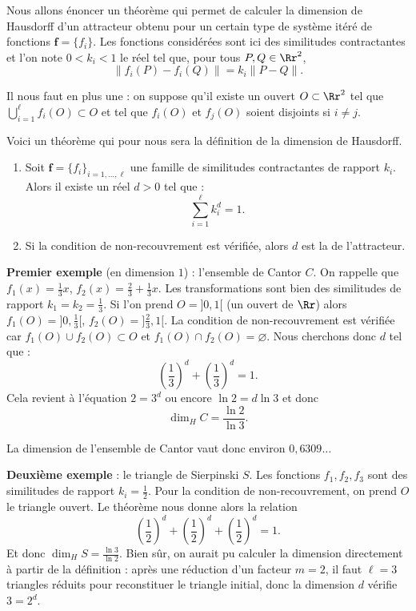 \documentclass[11pt,class=report,crop=false]{standalone}
\begin{document}
Nous allons énoncer un théorème qui permet de calculer la dimension de Hausdorff
d'un attracteur obtenu pour un certain type de système itéré de fonctions $\mathbf{f}=\{f_i\}$.
Les fonctions considérées sont ici des similitudes contractantes et l'on note $0<k_i<1$
le réel tel que, pour tous $P,Q \in \Rr^2$, 
$$\|f_i(P)-f_i(Q)\| = k_i \|P-Q\|.$$

Il nous faut en plus une  : on suppose qu'il existe un ouvert
$O \subset \Rr^2$ tel que $\bigcup_{i=1}^{\ell} f_i(O) \subset O$ et 
tel que $f_i(O)$ et $f_j(O)$ soient disjoints si $i\neq j$.

Voici un \og{}théorème\fg{} qui pour nous sera la définition de la dimension de Hausdorff.
\begin{theoreme}
\sauteligne
\begin{enumerate}
  \item Soit $\mathbf{f}=\{f_i\}_{i=1,\ldots,\ell}$ une famille de similitudes contractantes de rapport $k_i$.
Alors il existe un réel $d>0$ tel
que :
$$\sum_{i=1}^\ell k_i^d =1.$$
  \item Si la condition de non-recouvrement est vérifiée, alors 
  $d$ est la  de l'attracteur.
  \end{enumerate}
\end{theoreme}

\bigskip

\textbf{Premier exemple} (en dimension $1$) : l'ensemble de Cantor $C$. 
On rappelle que $f_1(x)=\frac 13x$, 
$f_2(x)=\frac 23 + \frac 13x$.
Les transformations sont
bien des similitudes de rapport $k_1=k_2=\frac13$.
Si l'on prend $O=]0,1[$ (un ouvert de $\Rr$) alors $f_1(O) = ]0,\frac 13[$, 
$f_2(O)=]\frac 23,1[$. 
La condition de non-recouvrement est vérifiée car $f_1(O)\cup f_2(O) \subset O$
et $f_1(O)\cap f_2(O)=\varnothing$.
Nous cherchons donc $d$ tel que :
$$\left(\frac 13 \right)^d + \left(\frac 13 \right)^d =1.$$
Cela revient à l'équation $2= 3^d$ ou encore
$\ln 2 = d \ln 3$ et donc 
$$\dim_H C = \frac{\ln 2}{\ln 3}.$$

La dimension de l'ensemble de Cantor vaut donc environ $0,6309\ldots$


\bigskip

\textbf{Deuxième exemple} : le triangle de Sierpinski $S$.
Les fonctions $f_1, f_2, f_3$ sont des similitudes de rapport
$k_i=\frac 12$. Pour la condition de non-recouvrement, on prend $O$
le triangle ouvert. Le théorème nous donne alors la relation
$$\left(\frac 12 \right)^d + \left(\frac 12 \right)^d+\left(\frac 12 \right)^d = 1.$$
Et donc $\dim_H S = \frac{\ln 3}{\ln 2}.$
Bien sûr, on aurait pu calculer la dimension directement à partir de la définition : après une réduction d'un facteur
$m=2$, il faut $\ell=3$ triangles réduits pour reconstituer le triangle initial, donc la dimension $d$ vérifie $3=2^d$.
\end{document}
